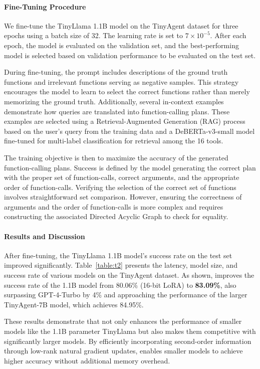 \paragraph{Fine-Tuning Procedure}

We fine-tune the TinyLlama 1.1B model on the TinyAgent dataset for three epochs using a batch size of 32. The learning rate is set to \(7 \times 10^{-5}\). After each epoch, the model is evaluated on the validation set, and the best-performing model is selected based on validation performance to be evaluated on the test set.

During fine-tuning, the prompt includes descriptions of the ground truth functions and irrelevant functions serving as negative samples. This strategy encourages the model to learn to select the correct functions rather than merely memorizing the ground truth. Additionally, several in-context examples demonstrate how queries are translated into function-calling plans. These examples are selected using a Retrieval-Augmented Generation (RAG) process based on the user's query from the training data and a DeBERTa-v3-small model \citep{he2021debertav3} fine-tuned for multi-label classification for retrieval among the 16 tools.

The training objective is then to maximize the accuracy of the generated function-calling plans. Success is defined by the model generating the correct plan with the proper set of function-calls, correct arguments, and the appropriate order of function-calls. Verifying the selection of the correct set of functions involves straightforward set comparison. However, ensuring the correctness of arguments and the order of function-calls is more complex and requires constructing the associated Directed Acyclic Graph to check for equality.

\paragraph{Results and Discussion}



After fine-tuning, the TinyLlama 1.1B model's success rate on the test set improved significantly. Table~\ref{table:t2} presents the latency, model size, and success rate of various models on the TinyAgent dataset. As shown, \textit{\lowrank} improves the success rate of the 1.1B model from 80.06\% (16-bit LoRA) to \textbf{83.09\%}, also surpassing GPT-4-Turbo by 4\% and approaching the performance of the larger TinyAgent-7B model, which achieves 84.95\%.

These results demonstrate that \textit{\lowrank} not only enhances the performance of smaller models like the 1.1B parameter TinyLlama but also makes them competitive with significantly larger models. By efficiently incorporating second-order information through low-rank natural gradient updates, \textit{\lowrank} enables smaller models to achieve higher accuracy without additional memory overhead.
